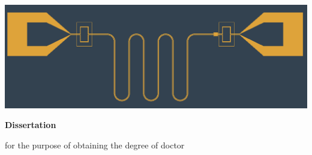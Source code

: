 \begin{titlepage}
\pagecolor{mDarkTeal}\afterpage{\nopagecolor}
{\color{mLightBrown}%
\begin{center}

\vspace*{2\bigskipamount}

{\makeatletter
\titlestyle\bfseries\LARGE\@title
\makeatother}

{\makeatletter
\ifx\@subtitle\undefined\else
    \bigskip
    \titlefont\titleshape\Large\@subtitle
\fi
\makeatother}

\vspace{10cm}
\includegraphics[width=\linewidth]{title/cover_circuit/cover_circuit}
\end{center}


}
\cleardoublepage
\thispagestyle{empty}

\begin{center}


\vspace*{2\bigskipamount}

{\makeatletter
\titlestyle\bfseries\LARGE\@title
\makeatother}

{\makeatletter
\ifx\@subtitle\undefined\else
    \bigskip
    \titlefont\titleshape\Large\@subtitle
\fi
\makeatother}

\vfill


{\Large\titlefont\bfseries Dissertation}

\bigskip
\bigskip

for the purpose of obtaining the degree of doctor


\end{center}
\end{titlepage}
